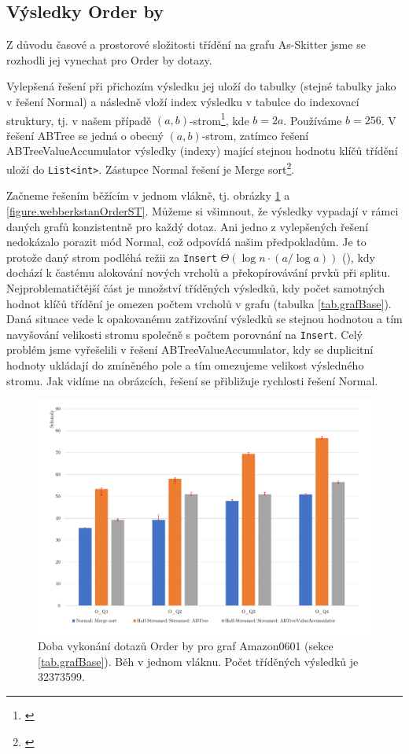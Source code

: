 \subsection{Výsledky Order by}

Z důvodu časové a prostorové složitosti třídění na grafu As-Skitter jsme se rozhodli jej vynechat pro Order by dotazy.

Vylepšená řešení při přichozím výsledku jej uloží do tabulky (stejné tabulky jako v řešení Normal) a následně vloží index výsledku v tabulce do indexovací struktury, tj. v našem případě $(a, b)$-strom\footnote{\citet[03. (a,b)-trees]{dataLecture}}, kde $b=2a$. 
Používáme $b=256$.
V řešení ABTree se jedná o obecný $(a, b)$-strom, zatímco řešení ABTreeValueAccumulator výsledky (indexy) mající stejnou hodnotu klíčů třídění uloží do \verb+List<int>+.
Zástupce Normal řešení je Merge sort\footnote{\citet{hpcsharp}}.

Začneme řešením běžícím v jednom vlákně, tj. obrázky  \ref{figure.amazonOrderST} a \ref{figure.webberkstanOrderST}.
Můžeme si všimnout, že výsledky vypadají v rámci daných grafů konzistentně pro každý dotaz.
Ani jedno z vylepšených řešení nedokázalo porazit mód Normal, což odpovídá našim předpokladům. 
Je to protože daný strom podléhá režii za \verb+Insert+ $\Theta(\log n \cdot (a/\log a))$ (\citet[03. (a,b)-trees str. 6]{dataLecture}), kdy dochází k častému alokování nových vrcholů a překopírovávání prvků při splitu.
Nejproblematičtější část je množství tříděných výsledků, kdy počet samotných hodnot klíčů třídění je omezen počtem vrcholů v grafu (tabulka \ref{tab.grafBase}). 
Daná situace vede k opakovanému zatřizování výsledků se stejnou hodnotou a tím navyšování velikosti stromu společně s počtem porovnání na \verb+Insert+.
Celý problém jsme vyřešelili v řešení ABTreeValueAccumulator, kdy se duplicitní hodnoty ukládají do zmíněného pole a tím omezujeme velikost výsledného stromu. 
Jak vidíme na obrázcích, řešení se přibližuje rychlosti řešení Normal.

\begin{figure}[!htp]
\includegraphics[width=\linewidth]{../img/amazonOrderByST.pdf}\centering
\caption{Doba vykonání dotazů Order by pro graf Amazon0601 (sekce \ref{tab.grafBase}). Běh v jednom vláknu. Počet tříděných výsledků je 32373599.}
\label{figure.amazonOrderST}
\end{figure}

